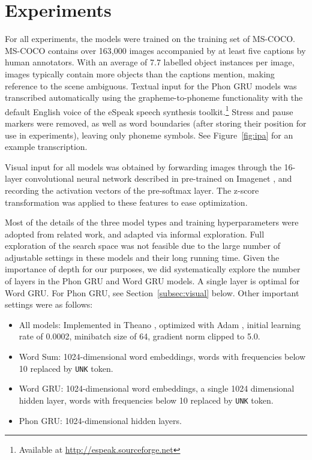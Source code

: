 \section{Experiments}
\label{sec:experiments}

For all experiments, the models were trained on the training set of MS-COCO. MS-COCO contains over 163,000 images accompanied by at least five captions by human annotators. With an average of 7.7 labelled object instances per image, images typically contain more objects than the captions mention, making reference to the scene ambiguous. Textual input for the {\sc Phon GRU} models was transcribed automatically using the grapheme-to-phoneme functionality with the default English voice of the eSpeak speech synthesis toolkit.\footnote{Available at \url{http://espeak.sourceforge.net}} Stress and pause markers were removed, as well as word boundaries (after storing their position for use in experiments), leaving only phoneme symbols. See Figure~\ref{fig:ipa} for an example transcription.


Visual input for all models was obtained by forwarding images through the 16-layer convolutional neural network described in  pre-trained on Imagenet \cite{ILSVRCarxiv14}, and recording the activation vectors of the pre-softmax layer. The z-score transformation was applied to these features to ease optimization. 

Most of the details of the three model types and training
hyperparameters were adopted from related work, and adapted via
informal exploration. Full exploration of the search space was not feasible due to the large number of adjustable settings in these models and their long running time. Given the importance of depth for our purposes, we did systematically explore the number of layers in the {\sc Phon GRU} and {\sc Word GRU} models. A single layer is optimal for {\sc Word GRU}. For {\sc Phon GRU}, see Section~\ref{subsec:visual} below. Other important settings were as follows:
\begin{itemize}
\setlength\itemsep{-0.5em}
\item All models: Implemented in Theano \cite{Bastien-Theano-2012}, optimized with 
  Adam \cite{DBLP:journals/corr/KingmaB14}, initial learning rate of 0.0002, minibatch size
  of 64, gradient norm clipped to 5.0.
\item {\sc Word Sum}: 1024-dimensional word embeddings, words with frequencies below 10 replaced by {\tt UNK} token.
\item {\sc Word GRU}: 1024-dimensional word embeddings, a single 1024 dimensional hidden layer, words with frequencies below 10 replaced by {\tt UNK} token.
\item {\sc Phon GRU}: 1024-dimensional hidden layers.
\end{itemize}

